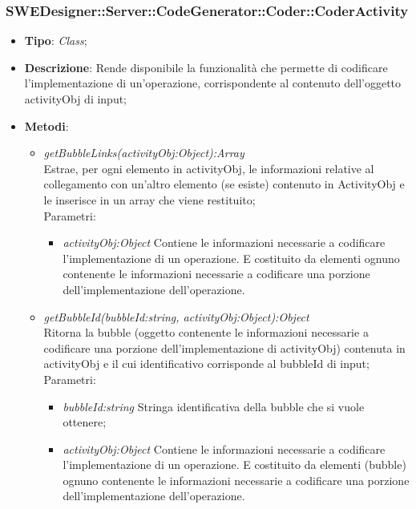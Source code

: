 \documentclass[../DefinizioneDiProdotto.tex]{subfiles}
\begin{document}
			
			
			\subsubsection{SWEDesigner::Server::CodeGenerator::Coder::CoderActivity}
			\hypertarget{SWEDesigner::Server::CodeGenerator::Coder::CoderActivity}{}
			\begin{itemize}
				\item \textbf{Tipo}: \emph{Class};
				\item \textbf{Descrizione}: Rende disponibile la funzionalità che permette di codificare l'implementazione di un'operazione, corrispondente al contenuto dell'oggetto activityObj di input; \\
				\item \textbf{Metodi}:
				\begin{itemize}
					\item \emph{getBubbleLinks(activityObj:Object):Array} \\ 
					Estrae, per ogni elemento in activityObj, le informazioni relative al collegamento con un'altro elemento (se esiste) contenuto in ActivityObj e
					le inserisce in un array che viene restituito; \\
					Parametri:
					\begin{itemize}
						\item \emph{activityObj:Object} Contiene le informazioni necessarie a codificare l'implementazione di un operazione. E costituito da elementi ognuno contenente le informazioni necessarie a codificare una porzione dell'implementazione dell'operazione.
					\end{itemize}
					
					\item \emph{getBubbleId(bubbleId:string, activityObj:Object):Object} \\ 
					Ritorna la bubble (oggetto contenente le informazioni necessarie a codificare una porzione dell'implementazione di activityObj) contenuta in activityObj e il cui identificativo corrisponde al bubbleId di input; \\
					Parametri:
					\begin{itemize}
						\item \emph{bubbleId:string} Stringa identificativa della bubble che si vuole ottenere;
						\item \emph{activityObj:Object} Contiene le informazioni necessarie a codificare l'implementazione di un operazione. E costituito da elementi (bubble) ognuno contenente le informazioni necessarie a codificare una porzione dell'implementazione dell'operazione.
					\end{itemize}
					

\end{itemize}
\end{itemize}
\end{document}
